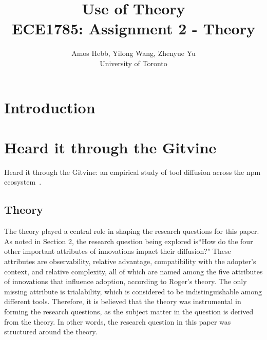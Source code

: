 \documentclass[journal,12pt,onecolumn,]{IEEEtran}
\begin{document}
\title{Use of Theory\\
{\normalsize ECE1785: Assignment 2 - Theory}}

\author{Amos Hebb, Yilong Wang, Zhenyue Yu\\ \small University of Toronto}

\maketitle






\section{Introduction}



\section{Heard it through the {\sc Git}vine}

Heard it through the {\sc Git}vine: an empirical study of tool diffusion across the npm ecosystem~\cite{lamba2020heard}.

\subsection{Theory}
The theory played a central role in shaping the research questions for this paper. As noted in Section 2, the research question being explored is``How do the four other important attributes of innovations impact their diffusion?"
 These attributes are observability, relative advantage, compatibility with the adopter's context, and relative complexity, all of which are named among the five attributes of innovations that influence adoption, according to Roger's theory. The only missing attribute is trialability, which is considered to be indistinguishable among different tools. 
 Therefore, it is believed that the theory was instrumental in forming the research questions, as the subject matter in the question is derived from the theory. In other words, the research question in this paper was structured around the theory.
\end{document}
